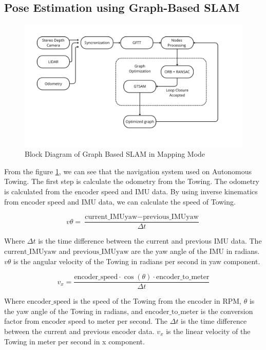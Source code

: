 \documentclass[conference]{IEEEtran}
\begin{document}
\subsection{Pose Estimation using Graph-Based SLAM}
\begin{figure}[H]
	\centering
	\includegraphics[width=\linewidth]{../konten/nav_map2.png}
	\caption{Block Diagram of Graph Based SLAM in Mapping Mode}
	\label{fig:slam_system}
\end{figure} 

From the figure \ref{fig:slam_system}, we can see that the navigation system used on Autonomous Towing. The first step is calculate the odometry from the Towing. The odometry is calculated from the encoder speed and IMU data. By using inverse kinematics from encoder speed and IMU data, we can calculate the speed of Towing. 

\begin{equation}
	v\theta = \frac{\text{current\_IMUyaw} - \text{previous\_IMUyaw}}{\Delta t}
	\label{eq:vtheta}
\end{equation}

Where \(\Delta t\) is the time difference between the current and previous IMU data. The \(\text{current\_IMUyaw}\) and \(\text{previous\_IMUyaw}\) are the yaw angle of the IMU in radians. \(v\theta\) is the angular velocity of the Towing in radians per second in yaw component.

\begin{equation}
	v_x = \frac{\text{encoder\_speed} \cdot \cos(\theta) \cdot \text{encoder\_to\_meter}}{\Delta t}
	\label{eq:vx}
\end{equation}

Where \(\text{encoder\_speed}\) is the speed of the Towing from the encoder in RPM, \(\theta\) is the yaw angle of the Towing in radians, and \(\text{encoder\_to\_meter}\) is the conversion factor from encoder speed to meter per second. The \(\Delta t\) is the time difference between the current and previous encoder data. \(v_x\) is the linear velocity of the Towing in meter per second in x component.
\end{document}
